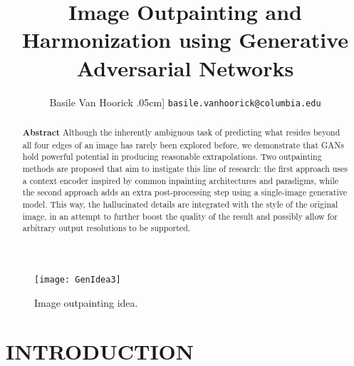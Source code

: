 \documentclass[twocolumn,showpacs,nofootinbib,aps,superscriptaddress,eqsecnum,prd,notitlepage,showkeys,10pt]{revtex4-1}
\begin{document}
\renewcommand{\topfraction}{.85}
\renewcommand{\bottomfraction}{.7}
\renewcommand{\textfraction}{.15}
\renewcommand{\floatpagefraction}{.66}
\renewcommand{\dbltopfraction}{.66}
\renewcommand{\dblfloatpagefraction}{.66}
\setcounter{topnumber}{9}
\setcounter{bottomnumber}{9}
\setcounter{totalnumber}{20}
\setcounter{dbltopnumber}{9}

\title{Image Outpainting and Harmonization using Generative Adversarial Networks}
\author{Basile Van Hoorick \0.05cm] \texttt{basile.vanhoorick@columbia.edu}}

\begin{abstract}
\textbf{Abstract} \hspace{0.3cm}
Although the inherently ambiguous task of predicting what resides beyond all four edges of an image has rarely been explored before, we demonstrate that GANs hold powerful potential in producing reasonable extrapolations. Two outpainting methods are proposed that aim to instigate this line of research: the first approach uses a context encoder inspired by common inpainting architectures and paradigms, while the second approach adds an extra post-processing step using a single-image generative model. This way, the hallucinated details are integrated with the style of the original image, in an attempt to further boost the quality of the result and possibly allow for arbitrary output resolutions to be supported.
\end{abstract}

\maketitle

\begin{figure}[tp]
\centering
  \begin{adjustbox}{center}
  \texttt{[image: GenIdea3]}
  \end{adjustbox}
  \caption{Image outpainting idea.}
  \label{fig:GenIdea}
\end{figure}

\section{INTRODUCTION}
\end{document}
